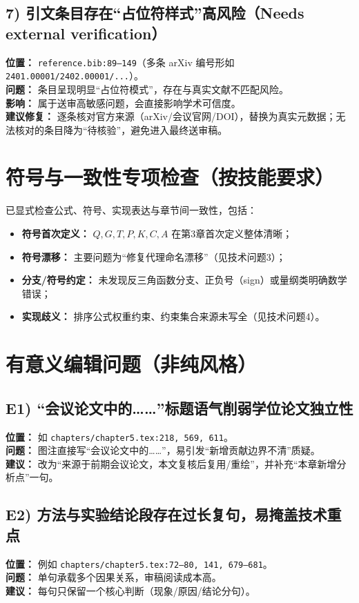 \documentclass[12pt]{ctexart}
\begin{document}
\subsection*{7) 引文条目存在“占位符样式”高风险（Needs external verification）}
\textbf{位置：} \texttt{reference.bib:89--149}（多条 arXiv 编号形如 \texttt{2401.00001/2402.00001/...}）。\\
\textbf{问题：} 条目呈现明显“占位符模式”，存在与真实文献不匹配风险。\\
\textbf{影响：} 属于送审高敏感问题，会直接影响学术可信度。\\
\textbf{建议修复：} 逐条核对官方来源（arXiv/会议官网/DOI），替换为真实元数据；无法核对的条目降为“待核验”，避免进入最终送审稿。

\section*{符号与一致性专项检查（按技能要求）}
已显式检查公式、符号、实现表达与章节间一致性，包括：
\begin{itemize}
  \item \textbf{符号首次定义：} \(Q,G,T,P,K,C,A\) 在第3章首次定义整体清晰；
  \item \textbf{符号漂移：} 主要问题为“修复代理命名漂移”（见技术问题3）；
  \item \textbf{分支/符号约定：} 未发现反三角函数分支、正负号（sign）或量纲类明确数学错误；
  \item \textbf{实现歧义：} 排序公式权重约束、约束集合来源未写全（见技术问题4）。
\end{itemize}

\section*{有意义编辑问题（非纯风格）}

\subsection*{E1) “会议论文中的……”标题语气削弱学位论文独立性}
\textbf{位置：} 如 \texttt{chapters/chapter5.tex:218, 569, 611}。\\
\textbf{问题：} 图注直接写“会议论文中的……”，易引发“新增贡献边界不清”质疑。\\
\textbf{建议：} 改为“来源于前期会议论文，本文复核后复用/重绘”，并补充“本章新增分析点”一句。

\subsection*{E2) 方法与实验结论段存在过长复句，易掩盖技术重点}
\textbf{位置：} 例如 \texttt{chapters/chapter5.tex:72--80, 141, 679--681}。\\
\textbf{问题：} 单句承载多个因果关系，审稿阅读成本高。\\
\textbf{建议：} 每句只保留一个核心判断（现象/原因/结论分句）。
\end{document}
